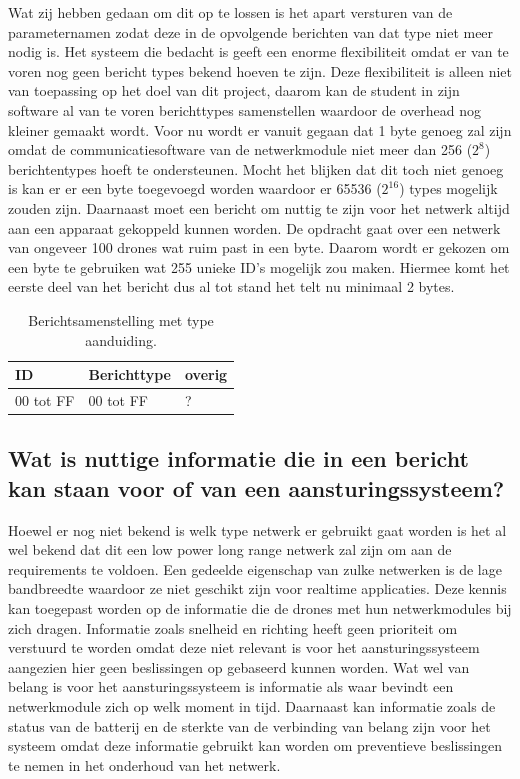 \documentclass[a4paper, 11pt, oneside]{report}
\begin{document}
Wat zij hebben gedaan om dit op te lossen is het apart versturen van de parameternamen zodat deze in de opvolgende berichten van dat type niet meer nodig is.
Het systeem die bedacht is geeft een enorme flexibiliteit omdat er van te voren nog geen bericht types bekend hoeven te zijn.
Deze flexibiliteit is alleen niet van toepassing op het doel van dit project, daarom kan de student in zijn software al van te voren berichttypes samenstellen waardoor de overhead nog kleiner gemaakt wordt.
Voor nu wordt er vanuit gegaan dat 1 byte genoeg zal zijn omdat de communicatiesoftware van de netwerkmodule niet meer dan 256 ($2^{8}$) berichtentypes hoeft te ondersteunen.
Mocht het blijken dat dit toch niet genoeg is kan er er een byte toegevoegd worden waardoor er 65536 ($2^{16}$) types mogelijk zouden zijn.
Daarnaast moet een bericht om nuttig te zijn voor het netwerk altijd aan een apparaat gekoppeld kunnen worden.
De opdracht gaat over een netwerk van ongeveer 100 drones wat ruim past in een byte.
Daarom wordt er gekozen om een byte te gebruiken wat 255 unieke ID's mogelijk zou maken. 
Hiermee komt het eerste deel van het bericht dus al tot stand het telt nu minimaal 2 bytes.

\begin{table}[H]
	\centering
	\begin{tabular}{|l|l|l|}
		\hline
		\rowcolor[HTML]{C0C0C0} 
		ID & Berichttype & overig \\ \hline
		00 tot FF   & 00 tot FF       & ?      \\ \hline
	\end{tabular}
	\caption{Berichtsamenstelling met type aanduiding.}
	\label{tab:serialstart}
\end{table}

\subsection{Wat is nuttige informatie die in een bericht kan staan voor of van een aansturingssysteem?}
\label{sub:watisnuttigeinformatie}
Hoewel er nog niet bekend is welk type netwerk er gebruikt gaat worden is het al wel bekend dat dit een low power long range netwerk zal zijn om aan de requirements te voldoen.
Een gedeelde eigenschap van zulke netwerken is de lage bandbreedte waardoor ze niet geschikt zijn voor realtime applicaties.
Deze kennis kan toegepast worden op de informatie die de drones met hun netwerkmodules bij zich dragen. 
Informatie zoals snelheid en richting heeft geen prioriteit om verstuurd te worden omdat deze niet relevant is voor het aansturingssysteem aangezien hier geen beslissingen op gebaseerd kunnen worden.
Wat wel van belang is voor het aansturingssysteem is informatie als waar bevindt een netwerkmodule zich op welk moment in tijd.
Daarnaast kan informatie zoals de status van de batterij en de sterkte van de verbinding van belang zijn voor het systeem omdat deze informatie gebruikt kan worden om preventieve beslissingen te nemen in het onderhoud van het netwerk.
\end{document}
